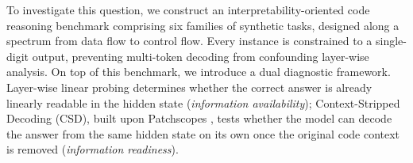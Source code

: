 To investigate this question, we construct an interpretability-oriented code reasoning benchmark comprising six families of synthetic tasks, designed along a spectrum from data flow to control flow. Every instance is constrained to a single-digit output, preventing multi-token decoding from confounding layer-wise analysis. On top of this benchmark, we introduce a dual diagnostic framework. Layer-wise linear probing determines whether the correct answer is already linearly readable in the hidden state (\textit{information availability}); Context-Stripped Decoding (CSD), built upon Patchscopes \citep{ghandeharioun2024patchscopes}, tests whether the model can decode the answer from the same hidden state on its own once the original code context is removed (\textit{information readiness}).

